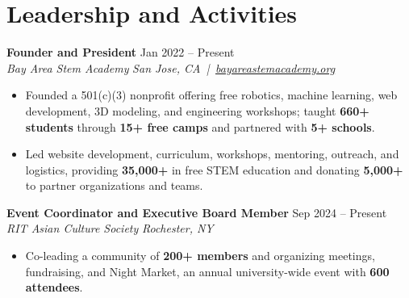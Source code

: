 \documentclass[10pt,letterpaper]{article}
\newif\ifresumeFirstRole
\newcommand{\resumeRole}[4]{%
  \ifresumeFirstRole
    \global\resumeFirstRolefalse
  \else
    \vspace{0pt plus 1fill}%
  \fi
  \textbf{#1} \hfill #2\\
  \textit{#3} \hfill \textit{#4}
}
\begin{document}
\section*{Leadership and Activities}
\resumeRole{Founder and President}{Jan 2022 -- Present}{Bay Area Stem Academy}{San Jose, CA \,|\, \href{https://bayareastemacademy.org}{bayareastemacademy.org}}
\begin{itemize}
  \item Founded a 501(c)(3) nonprofit offering free robotics, machine learning, web development, 3D modeling, and engineering workshops; taught \textbf{660+ students} through \textbf{15+ free camps} and partnered with \textbf{5+ schools}.
  \item Led website development, curriculum, workshops, mentoring, outreach, and logistics, providing \textbf{\textdollar{}35,000+} in free STEM education and donating \textbf{\textdollar{}5,000+} to partner organizations and teams.
\end{itemize}

\resumeRole{Event Coordinator and Executive Board Member}{Sep 2024 -- Present}{RIT Asian Culture Society}{Rochester, NY}
\begin{itemize}
  \item Co-leading a community of \textbf{200+ members} and organizing meetings, fundraising, and Night Market, an annual university-wide event with \textbf{600 attendees}.
\end{itemize}
\end{document}
